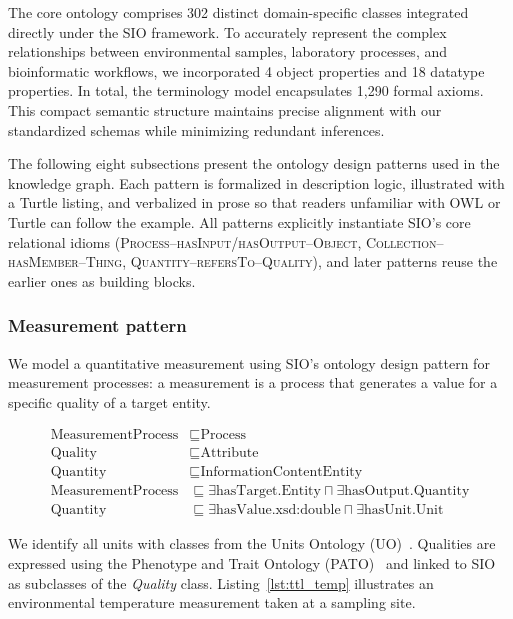\documentclass[11pt,a4paper]{article}
\begin{document}
The core ontology comprises 302 distinct domain-specific classes
integrated directly under the SIO framework. To accurately represent
the complex relationships between environmental samples, laboratory
processes, and bioinformatic workflows, we incorporated 4 object
properties and 18 datatype properties. In total, the terminology
model encapsulates 1{,}290 formal axioms. This compact semantic
structure maintains precise alignment with our standardized schemas
while minimizing redundant inferences.

The following eight subsections present the ontology design patterns
used in the knowledge graph. Each pattern is formalized in description
logic, illustrated with a Turtle listing, and verbalized in prose
so that readers unfamiliar with OWL or Turtle can follow the
example. All patterns explicitly instantiate SIO's core relational
idioms (\textsc{Process--hasInput/hasOutput--Object},
\textsc{Collection--hasMember--Thing},
\textsc{Quantity--refersTo--Quality}), and later patterns reuse the
earlier ones as building blocks.

\subsubsection{Measurement pattern}

We model a quantitative measurement using SIO's ontology design
pattern for measurement processes: a measurement is a process that
generates a value for a specific quality of a target entity.

\begin{align}
    \label{eq:measurement}
    \text{MeasurementProcess} & \sqsubseteq \text{Process} \\
    \text{Quality} & \sqsubseteq \text{Attribute} \\
    \text{Quantity} & \sqsubseteq \text{InformationContentEntity} \\
    \text{MeasurementProcess} & \sqsubseteq \exists \text{hasTarget}.\text{Entity} \sqcap \exists \text{hasOutput}.\text{Quantity} \\
    \text{Quantity} & \sqsubseteq \exists \text{hasValue}.\text{xsd:double} \sqcap \exists \text{hasUnit}.\text{Unit}
\end{align}

We identify all units with classes from the Units Ontology (UO)~\cite{uo}.
Qualities are expressed using the Phenotype and Trait Ontology
(PATO)~\cite{pato} and linked to SIO as subclasses of the
\emph{Quality} class. Listing~\ref{lst:ttl_temp} illustrates an
environmental temperature measurement taken at a sampling site.
\end{document}
